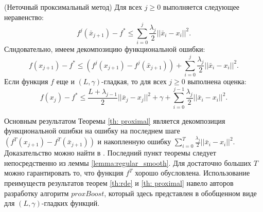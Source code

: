 \begin{theorem} \label{th: proximal}
    (Неточный проксимальный метод) Для всех $j \ge 0$ выполняется следующее неравенство:
    \[f^j(\bar{x}_{j + 1}) - f^* \le \sum_{i = 0}^{j}\frac{\lambda_j}{2}||\bar{x}_i - x_i||^2.\]
    Слндовательно, имеем декомпозицию функциональной ошибки:
    \[f(x_{j + 1}) - f^* \le (f^j(x_{j + 1}) - f^j(\bar{x}_{j + 1})) + \sum_{i = 0}^{j}\frac{\lambda_j}{2}||\bar{x}_i - x_i||^2.\]
    Если функция $f$ еще и $(L, \gamma)$-гладкая, то для всех $j \ge 0$ выполнена оценка:
    \begin{equation} \label{decomposition}
        f(x_j) - f^* \le \frac{L + \lambda_{j - 1}}{2} ||\bar{x}_j - x_j||^2 + \gamma + \sum_{i = 0}^{j - 1}\frac{\lambda_j}{2}||\bar{x}_i - x_i||^2.
    \end{equation}
\end{theorem}

Основным результатом Теоремы \eqref{th: proximal} является декомпозиция функциональной ошибки на ошибку на последнем шаге $(f^T(x_{j + 1}) - f^T(\bar{x}_{j + 1}))$ и накопленную ошибку $\sum_{i = 0}^{T}\frac{\lambda_j}{2}||\bar{x}_i - x_i||^2$. Доказательство можно найти в \cite{davis2021low}. Последний пункт теоремы следует непосредственно из леммы \ref{lemma:regular_smooth}. Для достаточно больших $T$ можно гарантировать то, что функция $f^T$ хорошо обусловлена. Использование преимуществ результатов теорем \eqref{th:rde} и \eqref{th: proximal} навело авторов \cite{davis2021low} разработку алгоритм $proxBoost$, который здесь представлен в обобщенном виде для $(L, \gamma)$-гладких функций.

